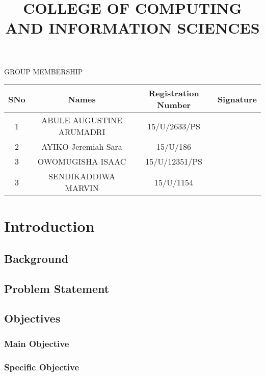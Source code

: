 \documentclass[11pt]{article}
\begin{document}
\title{COLLEGE OF COMPUTING AND INFORMATION SCIENCES}
\maketitle

\begin{center}\begin{large}GROUP MEMBERSHIP \end{large} \end{center}

\begin{tabular} {|c|c|c|c|}
\hline
SNo & Names & Registration  Number & Signature \\ \hline
1 & ABULE AUGUSTINE ARUMADRI &  15/U/2633/PS &  \\ \hline
2 & AYIKO Jeremiah Sara &  15/U/186 & \\ \hline
3 & OWOMUGISHA ISAAC &  15/U/12351/PS & \\ \hline
3 & SENDIKADDIWA MARVIN &  15/U/1154 & \\ \hline
\end{tabular}

\tableofcontents

\section{Introduction}
	\subsection{Background}
	\subsection{Problem Statement}
	\subsection{Objectives}
		\subsubsection{Main Objective}
		\subsubsection{Specific Objective}
\end{document}
